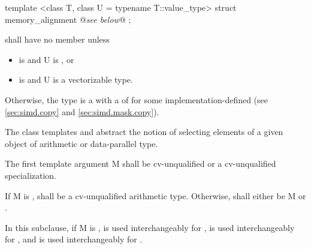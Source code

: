 \begin{itemdecl}
template <class T, class U = typename T::value_type> struct memory_alignment { @\emph{see below}@ };
\end{itemdecl}
\begin{itemdescr}
  \pnum
   shall have no member  unless
  \begin{itemize}
    \item {} is \true and \type U is \bool, or
    \item {} is \true and \type U is a vectorizable type.
  \end{itemize}

  \pnum
  Otherwise, the type  is a \BinaryTypeTrait with a \BaseCharacteristic of  for some implementation-defined  (see \ref{sec:simd.copy} and \ref{sec:simd.mask.copy}).

  \pnum{}
\end{itemdescr}



\pnum The class templates  and  abstract the notion of selecting elements of a given object of arithmetic or data-parallel type.

\pnum The first template argument \type M shall be cv-unqualified \bool or a cv-unqualified \mask specialization.

\pnum
If \type M is \bool,  shall be a cv-unqualified arithmetic type. %
Otherwise,  shall either be \type M or .


\pnum In this subclause, if \type M is \bool,  is used interchangeably for ,
 is used interchangeably for , and
 is used interchangeably for .

